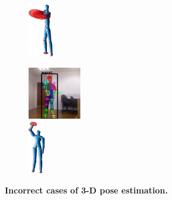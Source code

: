 \begin{figure}
\begin{subfigure}[t]{0.18\linewidth}
		\includegraphics[height=2.3cm]{fig/body/APE/boxerr2.png} 
		\label{fig/body/APEerr3}
	\end{subfigure}
	\begin{subfigure}[t]{0.18\linewidth} \centering
		\includegraphics[height=2.3cm]{fig/body/APE/wave1err.jpg} \\
		\includegraphics[height=2.3cm]{fig/body/APE/wave1err.png} 
		\label{fig/body/APEerr4}
	\end{subfigure}
	\label{fig/body/APEerr}
	\caption{\textbf{Incorrect cases of 3-D pose estimation.}}
\end{figure}
